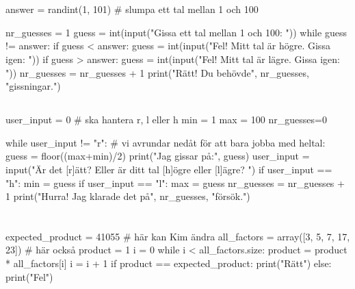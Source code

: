 \section*{}
\subsection*{}
\vspace{3pt}
\begin{python}
answer = randint(1, 101) # slumpa ett tal mellan 1 och 100

nr_guesses = 1
guess = int(input("Gissa ett tal mellan 1 och 100: "))
while guess != answer:
    if guess < answer:
        guess = int(input("Fel! Mitt tal är högre. Gissa igen: "))
    if guess > answer:
        guess = int(input("Fel! Mitt tal är lägre. Gissa igen: "))
    nr_guesses = nr_guesses + 1
print("Rätt! Du behövde", nr_guesses, "gissningar.")
\end{python}

\subsection*{}
\vspace{3pt}
\begin{python}
user_input = 0 # ska hantera r, l eller h
min = 1
max = 100
nr_guesses=0

while user_input != "r":
	# vi avrundar nedåt för att bara jobba med heltal:
	guess = floor((max+min)/2)
	print("Jag gissar på:", guess)
	user_input = input("Är det [r]ätt? Eller är ditt tal [h]ögre eller [l]ägre? ")
	if user_input == "h":
		min = guess
	if user_input == "l":
		max = guess
	nr_guesses = nr_guesses + 1
print("Hurra! Jag klarade det på", nr_guesses, "försök.")
\end{python}


\section*{}

\subsection*{}
\vspace{3pt}
\begin{python}
expected_product = 41055 # här kan Kim ändra
all_factors = array([3, 5, 7, 17, 23]) # här också
product = 1
i = 0
while i < all_factors.size:
	product = product * all_factors[i]
	i = i + 1
if product == expected_product:
	print("Rätt")
else:
	print("Fel")
\end{python}

